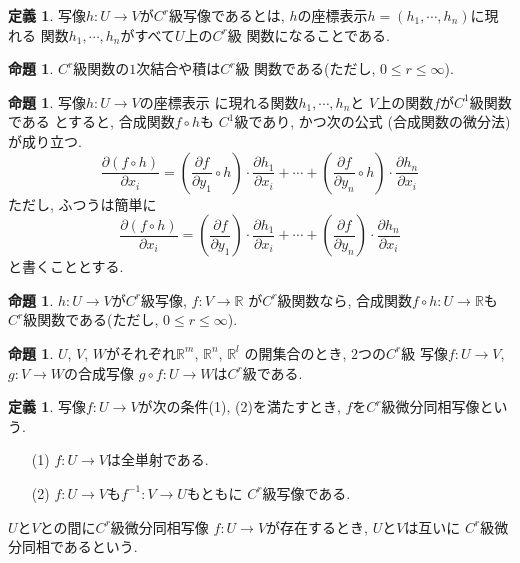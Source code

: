 \documentclass[a4j,12pt]{jarticle}
\theoremstyle{definition}
\newtheorem{definition}[theorem]{定義}
\newtheorem{proposition}[theorem]{命題}
\begin{document}
\begin{definition}\label{def:C^r map}
    写像$h:U\to V$が$C^r$級写像であるとは, 
    $h$の座標表示$h=(h_1,\cdots ,h_n)$に現れる
    関数$h_1,\cdots ,h_n$がすべて$U$上の$C^r$級
    関数になることである. 
\end{definition}
\begin{proposition}
    $C^r$級関数の$1$次結合や積は$C^r$級
    関数である(ただし, $0\leq r\leq \infty$). 
\end{proposition}
\begin{proposition}
    写像$h:U\to V$の座標表示
    に現れる関数$h_1,\cdots ,h_n$と
    $V$上の関数$f$が$C^1$級関数である
    とすると, 合成関数$f\circ h$も
    $C^1$級であり, かつ次の公式
    (合成関数の微分法)が成り立つ. 
    $$\frac{\partial (f\circ h)}{\partial x_i}=
    \left(\frac{\partial f}{\partial y_1}
    \circ h\right)\cdot \frac{\partial h_1}
    {\partial x_i}+\cdots +
    \left(\frac{\partial f}{\partial y_n}
    \circ h\right)\cdot \frac{\partial h_n}
    {\partial x_i}$$
    ただし, ふつうは簡単に
    $$\frac{\partial (f\circ h)}{\partial x_i}=
    \left(\frac{\partial f}{\partial y_1}
    \right)\cdot \frac{\partial h_1}
    {\partial x_i}+\cdots +
    \left(\frac{\partial f}{\partial y_n}
    \right)\cdot \frac{\partial h_n}
    {\partial x_i}$$
    と書くこととする. 
\end{proposition}
\begin{proposition}
    $h:U\to V$が$C^r$級写像, $f:V\to \mathbb{R}$
    が$C^r$級関数なら, 合成関数$f\circ h:U\to 
    \mathbb{R}$も$C^r$級関数である(ただし, 
    $0\leq r\leq \infty$). 
\end{proposition}
\begin{proposition}
    $U$, $V$, $W$がそれぞれ$\mathbb{R}^m$, 
    $\mathbb{R}^n$, $\mathbb{R}^l$
    の開集合のとき, $2$つの$C^r$級
    写像$f:U\to V$, $g:V\to W$の合成写像
    $g\circ f:U\to W$は$C^r$級である. 
\end{proposition}
\begin{definition}\label{def:C^r diffeomorphism}
    写像$f:U\to V$が次の条件(1), (2)を満たすとき, 
    $f$を$C^r$級微分同相写像という. 
    \begin{itemize}
        \item[(1)]
        $f:U\to V$は全単射である. 
        \item[(2)]
        $f:U\to V$も$f^{-1}:V\to U$もともに
        $C^r$級写像である. 
    \end{itemize}
\end{definition}
$U$と$V$との間に$C^r$級微分同相写像
$f:U\to V$が存在するとき, $U$と$V$は互いに
$C^r$級微分同相であるという. 
\end{document}
